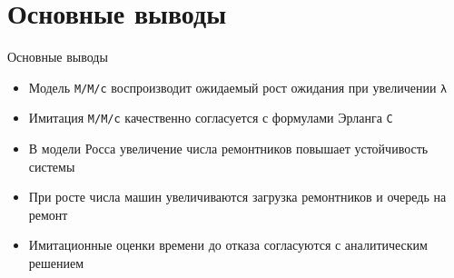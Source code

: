 \documentclass[
  ignorenonframetext,
  aspectratio=169,
  russian,
]{beamer}
\providecommand{\tightlist}{%
  \setlength{\itemsep}{0pt}\setlength{\parskip}{0pt}}\usepackage{longtable,booktabs,array}
\begin{document}
\section{Основные
выводы}\label{ux43eux441ux43dux43eux432ux43dux44bux435-ux432ux44bux432ux43eux434ux44b}

\begin{frame}[fragile]{Основные выводы}
\begin{itemize}[<+->]
\tightlist
\item
  Модель \texttt{M/M/c} воспроизводит ожидаемый рост ожидания при
  увеличении \texttt{λ}
\item
  Имитация \texttt{M/M/c} качественно согласуется с формулами Эрланга
  \texttt{C}
\item
  В модели Росса увеличение числа ремонтников повышает устойчивость
  системы
\item
  При росте числа машин увеличиваются загрузка ремонтников и очередь на
  ремонт
\item
  Имитационные оценки времени до отказа согласуются с аналитическим
  решением
\end{itemize}
\end{frame}
\end{document}
